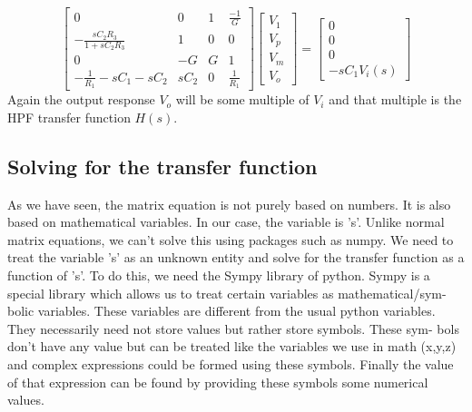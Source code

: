 \documentclass[12pt, a4paper]{article}
\begin{document}
\begin{equation*}
    \begin{bmatrix}
        0 & 0 & 1 & \frac{-1}{G}\\
        -\frac{sC_{2}R_{3}}{1+sC_{2}R_{3}} & 1 & 0 & 0\\
        0 & -G & G & 1\\
        -\frac{1}{R_{1}}-sC_{1}-sC_{2} & sC_{2} & 0 & \frac{1}{R_{1}}
    \end{bmatrix}
    \begin{bmatrix}
        V_{1}\\
        V_{p}\\
        V_{m}\\
        V_{o}
    \end{bmatrix}
    =
    \begin{bmatrix}
        0\\
        0\\
        0\\
        -sC_{1}V_{i}(s)
    \end{bmatrix}
\end{equation*}
Again the output response $V_{o}$ will be some multiple of $V_{i}$ and that multiple is the HPF transfer function $H(s)$.
\subsection{Solving for the transfer function}
As we have seen, the matrix equation is not purely based on numbers. It is also
based on mathematical variables. In our case, the variable is 's'. Unlike normal
matrix equations, we can't solve this using packages such as numpy. We need to
treat the variable 's' as an unknown entity and solve for the transfer function as
a function of 's'. To do this, we need the Sympy library of python. Sympy is a
special library which allows us to treat certain variables as mathematical/sym-
bolic variables. These variables are different from the usual python variables.
They necessarily need not store values but rather store symbols. These sym-
bols don't have any value but can be treated like the variables we use in math
(x,y,z) and complex expressions could be formed using these symbols. Finally
the value of that expression can be found by providing these symbols some
numerical values.
\end{document}
